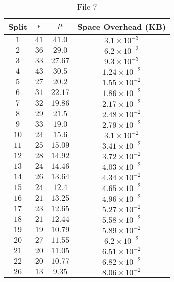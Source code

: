 \begin{center}
\begin{table}
\begin{center}
\begin{tabular}{ c | c | c | c }
		\end{tabular}
	\end{center}
	\end{table}	
		\vspace*{0.5 cm}
	\begin{table}
	\begin{center}
  \caption{File 7}\label{tab:n2}
		\begin{tabular}{c | c | c | c }
			\hline
			Split & $\epsilon$ & $\mu$ & Space Overhead (KB) \\ \hline
			\hline
			$1$ & $41$ & $41.0$ & $3.1\times 10^{-3}$ \\ 
			$2$ & $36$ & $29.0$ & $6.2\times 10^{-3}$ \\ 
			$3$ & $33$ & $27.67$ & $9.3\times 10^{-3}$ \\ 
			$4$ & $43$ & $30.5$ & $1.24\times 10^{-2}$ \\ 
			$5$ & $27$ & $20.2$ & $1.55\times 10^{-2}$ \\ 
			$6$ & $31$ & $22.17$ & $1.86\times 10^{-2}$ \\ 
			$7$ & $32$ & $19.86$ & $2.17\times 10^{-2}$ \\ 
			$8$ & $29$ & $21.5$ & $2.48\times 10^{-2}$ \\ 
			$9$ & $33$ & $19.0$ & $2.79\times 10^{-2}$ \\ 
			$10$ & $24$ & $15.6$ & $3.1\times 10^{-2}$ \\ 
			$11$ & $25$ & $15.09$ & $3.41\times 10^{-2}$ \\ 
			$12$ & $28$ & $14.92$ & $3.72\times 10^{-2}$ \\ 
			$13$ & $24$ & $14.46$ & $4.03\times 10^{-2}$ \\ 
			$14$ & $26$ & $13.64$ & $4.34\times 10^{-2}$ \\ 
			$15$ & $24$ & $12.4$ & $4.65\times 10^{-2}$ \\ 
			$16$ & $21$ & $13.25$ & $4.96\times 10^{-2}$ \\ 
			$17$ & $23$ & $12.65$ & $5.27\times 10^{-2}$ \\ 
			$18$ & $21$ & $12.44$ & $5.58\times 10^{-2}$ \\ 
			$19$ & $19$ & $10.79$ & $5.89\times 10^{-2}$ \\ 
			$20$ & $27$ & $11.55$ & $6.2\times 10^{-2}$ \\ 
			$21$ & $20$ & $11.05$ & $6.51\times 10^{-2}$ \\ 
			$22$ & $20$ & $10.77$ & $6.82\times 10^{-2}$ \\ 
			$26$ & $13$ & $9.35$ & $8.06\times 10^{-2}$ \\ 

\end{tabular}
\end{center}
\end{table}
\end{center}
